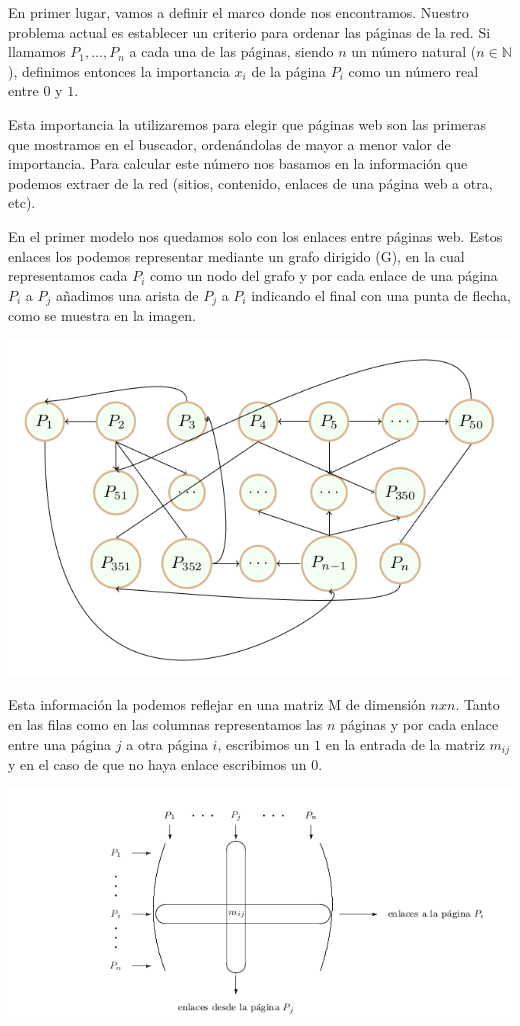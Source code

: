 \documentclass[size=a4, parskip=half, titlepage=false, toc=flat, toc=bib, 12pt]{scrartcl}
\theoremstyle{theorem-style}
\theoremstyle{definition-style}
\theoremstyle{remark-style}
\theoremstyle{example-style}
\theoremstyle{definition-style}
\theoremstyle{remark-style}
\begin{document}
En primer lugar, vamos a definir el marco donde nos encontramos. Nuestro problema actual es establecer un criterio para ordenar las páginas de la red. Si llamamos $P_1, \dots, P_n$ a cada una de las páginas, siendo $n$ un número natural ($n \in \mathbb{N}$), definimos entonces la importancia $x_i$  de la página $P_i$ como un número real entre $0$ y $1$.

Esta importancia la utilizaremos para elegir que páginas web son las primeras que mostramos en el buscador, ordenándolas de mayor  a menor valor de importancia.
Para calcular este número nos basamos en la información que podemos extraer de la red (sitios, contenido, enlaces de una página web a otra, etc).

En el primer modelo nos quedamos solo con los enlaces entre páginas web. Estos enlaces los podemos representar mediante un grafo dirigido (G), en la cual representamos cada $P_i$ como un nodo del grafo y por cada enlace de una página $P_i$ a $P_j$ añadimos una arista de $P_j$ a $P_i$ indicando el final con una punta de flecha, como se muestra en la imagen.

\includegraphics[width=1.0\textwidth]{./img/grafoini}

Esta información la podemos reflejar en una matriz M de dimensión $nxn$. Tanto en las filas como en las columnas representamos las $n$ páginas y por cada enlace entre una página $j$ a otra página $i$, escribimos un $1$ en la entrada de la
matriz $m_{ij}$ y en el caso de que no haya enlace escribimos un $0$.

\includegraphics[width=1.0\textwidth]{./img/matriz}
\end{document}
